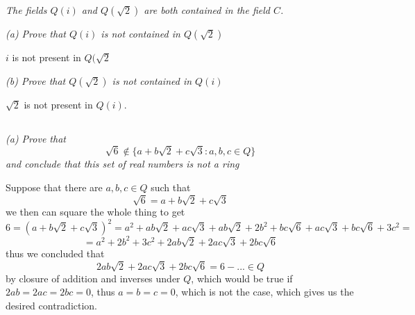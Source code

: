 \documentclass[11pt,oneside,titlepage]{book}
\newcommand{\set}[1]{\{ #1 \}}
\begin{document}
\textit{The fields $Q(i)$ and $Q(\sqrt{2})$ are both contained in the field $C$.}

\textit{(a) Prove that $Q(i)$ is not contained in $Q(\sqrt{2})$}

$i$ is not present in $Q(\sqrt{2}$

\textit{(b) Prove that $Q(\sqrt{2})$ is not contained in $Q(i)$}

$\sqrt{2}$ is not present in $Q(i)$.

\subsection{}

\textit{(a) Prove that
  $$\sqrt{6} \notin \set{a + b\sqrt{2} + c\sqrt{3}: a, b, c \in Q}$$
  and conclude that this set of real numbers is not a ring }

Suppose that there are $a, b, c \in Q$ such that
$$\sqrt{6} = a + b\sqrt{2} + c\sqrt{3}$$
we then can square the whole thing to get
$$6 = (a + b\sqrt{2} + c\sqrt{3})^2 = a^2 + ab\sqrt{2} + ac\sqrt{3} + ab\sqrt{2} + 2b^2 + bc\sqrt{6} +
ac\sqrt{3} + bc\sqrt{6} + 3c^2 = $$
$$ = a^2 + 2b^2 + 3c^2 + 2 ab\sqrt{2} + 2 ac \sqrt{3} + 2bc\sqrt{6}$$
thus we concluded that
$$ 2 ab\sqrt{2} + 2 ac \sqrt{3} + 2bc\sqrt{6} = 6 - ... \in Q$$
by closure of addition and inverses under $Q$, which would be true if
$2ab = 2ac = 2bc = 0$, thus $a = b = c = 0$, which is not the case,
which gives us the desired contradiction.
\end{document}
